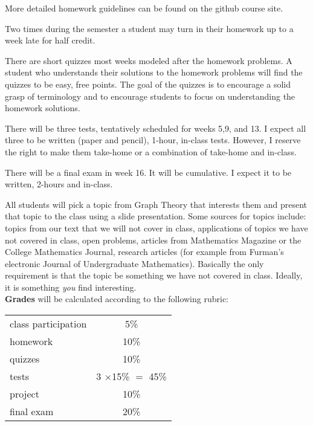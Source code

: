 \documentclass[11pt]{article}
\begin{document}
More detailed homework guidelines can be found on the github course site.

Two times during the semester a student may turn in their homework up to a week late for half credit.\\ 

{}

There are short quizzes most weeks modeled after the homework problems. A student who understands their solutions to the homework problems will find the quizzes to be easy, free points. The goal of the quizzes is to encourage a solid grasp of terminology and to encourage students to focus on understanding the homework solutions.\\

{}

There will be three tests, tentatively scheduled for weeks 5,9, and 13. I expect all three to be written (paper and pencil), 1-hour, in-class tests. However, I reserve the right to make them take-home or a combination of take-home and in-class.

There will be a final exam in week 16. It will be cumulative. I expect it to be written, 2-hours and in-class. \\

{}

All students will pick a topic from Graph Theory that interests them and present that topic to the class using a slide presentation. Some sources for topics include: topics from our text that we will not cover in class, applications of topics we have not covered in class, open problems, articles from Mathematics Magazine or the College Mathematics Journal, research articles (for example from Furman's electronic Journal of Undergraduate Mathematics). Basically the only requirement is that the topic be something we have not covered in class. Ideally, it is something \emph{you} find interesting.\\

\textbf{Grades} will be calculated according to the following rubric:

\begin{tabular}{|l|c|}
  \hline
  class participation & 5\%\\
  homework & 10\% \\
  quizzes&10\%\\
  tests & 3 $\times$15\% $=$ 45\%\\
  project & 10\%\\
  final exam & 20\% \\
  \hline
\end{tabular}
\end{document}
